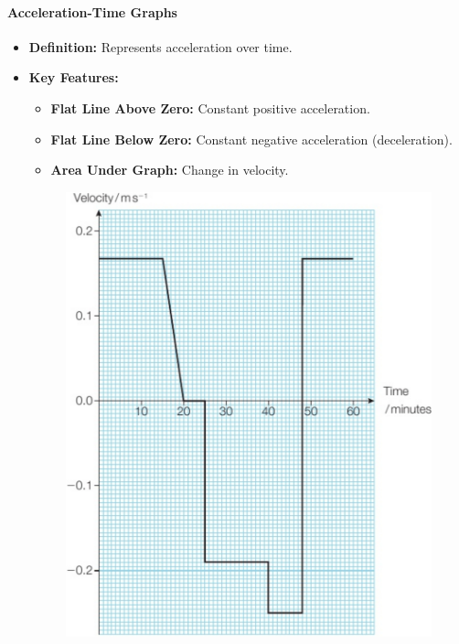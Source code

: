 \paragraph{Acceleration-Time Graphs}
\begin{itemize}
    \item \textbf{Definition:} Represents acceleration over time.
    \item \textbf{Key Features:}
    \begin{itemize}
        \item \textbf{Flat Line Above Zero:} Constant positive acceleration.
        \item \textbf{Flat Line Below Zero:} Constant negative acceleration (deceleration).
        \item \textbf{Area Under Graph:} Change in velocity.
    \end{itemize}
    \begin{figure}[H]
        \centering
        \includegraphics[scale=0.15]{Physics/1A/Images/1A-2-3.png}
    \end{figure}
\end{itemize}

